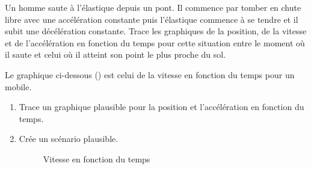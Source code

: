 \begin{exercise}
  Un homme saute à l'élastique depuis un pont. Il commence par tomber en chute libre avec une accélération constante puis l'élastique commence à se tendre et il subit une décélération constante. Trace les graphiques de la position, de la vitesse et de l'accélération en fonction du temps pour cette situation entre le moment où il saute et celui où il atteint son point le plus proche du sol.
\end{exercise}

\begin{exercise}
  Le graphique ci-dessous () est celui de la vitesse en fonction du temps pour un mobile.
  \begin{enumerate}[label=\alph*)]
    \item Trace un graphique plausible pour la position et l'accélération en fonction du temps.
    \item Crée un scénario plausible.
          \begin{figure}[h!]
            \centering
            \caption{Vitesse en fonction du temps}
            \label{fig:vitesse_temps_exe}
          \end{figure}
  \end{enumerate}
\end{exercise}
\begin{solution}
\end{solution}


